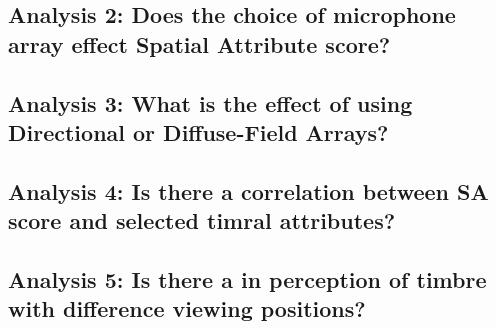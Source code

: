 \documentclass{aes2e}
\begin{document}
		
		




	\subsection{Analysis 2: Does the choice of microphone array effect Spatial Attribute score?}


	\subsection{Analysis 3: What is the effect of using Directional or Diffuse-Field Arrays?}


	\subsection{Analysis 4: Is there a correlation between SA score and selected timral attributes?}


	\subsection{Analysis 5: Is there a in perception of timbre with difference viewing positions?}





\end{document}
